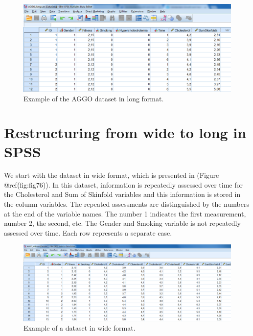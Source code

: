\documentclass[
]{book}
\begin{document}
\begin{figure}

{\centering \includegraphics[width=0.9\linewidth]{images/fig7.3} 

}

\caption{Example of the AGGO dataset in long format.}\label{fig:fig75}
\end{figure}

\hypertarget{restructuring-from-wide-to-long-in-spss}{%
\section{Restructuring from wide to long in
SPSS}\label{restructuring-from-wide-to-long-in-spss}}

We start with the dataset in wide format, which is presented in (Figure
@ref(fig:fig76)). In this dataset, information is repeatedly assessed
over time for the Cholesterol and Sum of Skinfold variables and this
information is stored in the column variables. The repeated assessments
are distinguished by the numbers at the end of the variable names. The
number 1 indicates the first measurement, number 2, the second, etc. The
Gender and Smoking variable is not repeatedly assessed over time. Each
row represents a separate case.

\begin{figure}

{\centering \includegraphics[width=0.9\linewidth]{images/fig7.6} 

}

\caption{Example of a dataset in wide format.}\label{fig:fig76}
\end{figure}
\end{document}
